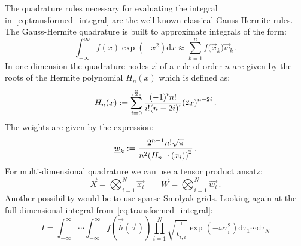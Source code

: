 \documentclass[a4paper,10pt]{article}
\begin{document}
The quadrature rules necessary for evaluating the integral
in~\eqref{eq:transformed_integral} are the well known
classical Gauss-Hermite rules. The Gauss-Hermite quadrature
is built to approximate integrals of the form:
\begin{equation}
  \int_{-\infty}^\infty f\left(x\right) \exp(-x^2) \mathrm{d}x
  \approx
  \sum_{k=1}^n f\bigl(\vec{x}_k\bigr) \vec{w}_k \,.
\end{equation}
In one dimension the quadrature nodes $\vec{x}$ of a rule of
order $n$ are given by the roots of the Hermite polynomial $H_n(x)$
which is defined as:
\begin{equation}
  H_n(x) := \sum_{i=0}^{\lfloor\frac{n}{2}\rfloor}
                   \frac{{(-1)}^i n!}{i!(n-2i)!} {(2x)}^{n-2i} \,.
\end{equation}
The weights are given by the expression:
\begin{equation}
  \underline{w}_k := \frac{2^{n-1} n! \sqrt{\pi}}{n^2 {\left(H_{n-1}(x_i)\right)}^2} \,.
\end{equation}
For multi-dimensional quadrature we can use a tensor product ansatz:
\begin{equation}
  \vec{X} = \bigotimes_{i=1}^N \vec{x_i} \quad\quad
  \vec{W} = \bigotimes_{i=1}^N \vec{w_i} \,.
\end{equation}
Another possibility would be to use sparse Smolyak grids.
Looking again at the full dimensional integral from~\eqref{eq:transformed_integral}:
\begin{equation}
 I = \int_{-\infty}^\infty \cdots \int_{-\infty}^\infty
       f\left(\vec{\tilde{h}}(\vec{\tau})\right)
       \prod_{i=1}^N \sqrt{\frac{\imath}{t_{i,i}}}
                     \exp\left(-\omega \tau_i^2\right)
    \mathrm{d}\tau_1 \cdots \mathrm{d}\tau_N
\end{equation}
\end{document}
